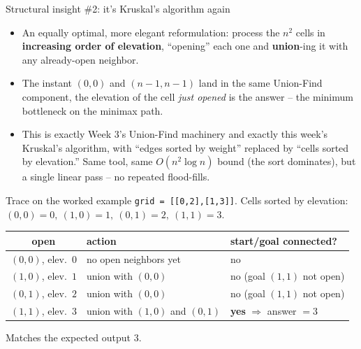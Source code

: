 \documentclass[11pt,aspectratio=169]{beamer}
\begin{document}
\begin{frame}{Structural insight \#2: it's Kruskal's algorithm again}
  \begin{itemize}
    \item An equally optimal, more elegant reformulation: process the $n^2$
    cells in \textbf{increasing order of elevation}, ``opening'' each one and
    \textbf{union}-ing it with any already-open neighbor.
    \item The instant $(0,0)$ and $(n{-}1,n{-}1)$ land in the same Union-Find
    component, the elevation of the cell \emph{just opened} is the answer -- the
    minimum bottleneck on the minimax path.
    \item This is exactly Week 3's Union-Find machinery and exactly this week's
    Kruskal's algorithm, with ``edges sorted by weight'' replaced by ``cells
    sorted by elevation.'' Same tool, same $O(n^2\log n)$ bound (the sort
    dominates), but a single linear pass -- no repeated flood-fills.
  \end{itemize}
\end{frame}

\begin{frame}{Trace on the worked example}
  \scriptsize
  \texttt{grid = [[0,2],[1,3]]}. Cells sorted by elevation:
  $(0,0){=}0,\ (1,0){=}1,\ (0,1){=}2,\ (1,1){=}3$.
  \begin{center}
  \begin{tabular}{@{}c p{2.6cm} p{4.4cm}@{}}
    \toprule
    open & action & start/goal connected? \\
    \midrule
    $(0,0)$, elev.\ $0$ & no open neighbors yet & no \\
    $(1,0)$, elev.\ $1$ & union with $(0,0)$ & no (goal $(1,1)$ not open) \\
    $(0,1)$, elev.\ $2$ & union with $(0,0)$ & no (goal $(1,1)$ not open) \\
    $(1,1)$, elev.\ $3$ & union with $(1,0)$ and $(0,1)$ & \textbf{yes} $\Rightarrow$ answer $=3$ \\
    \bottomrule
  \end{tabular}
  \end{center}
  Matches the expected output $3$.
\end{frame}
\end{document}
